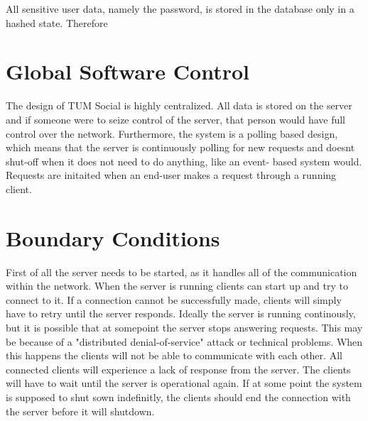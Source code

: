 \documentclass[a4paper,12pt]{scrartcl}
\begin{document}
    All sensitive user data, namely the password, is stored in the database only in a hashed state. Therefore 


    \section{Global Software Control}
    
    The design of TUM Social is highly centralized. All data is stored on the server and if someone were to seize control of the server, that person would have full control over the network.
    Furthermore, the system is a polling based design, which means that the server is continuously polling for new requests and doesnt shut-off when it does not need to do anything, like an event-			based system would. Requests are initaited when an end-user makes a request through a running client. 


    \section{Boundary Conditions}
   First of all the server needs to be started, as it handles all of the communication within the network. When the server is running clients can start up and try to connect to it. If a connection cannot be successfully made, clients will simply have to retry until the server responds. Ideally the server is running continously, but it is possible that at somepoint the server stops answering requests. This may be because of a "distributed denial-of-service" attack or technical problems. When this happens the clients will not be able to communicate with each other. All connected clients will experience a lack of response from the server. The clients will have to wait until the server is operational again. If at some point the system is supposed to shut sown indefinitly, the clients should end the connection with the server before it will shutdown.\\
\end{document}
